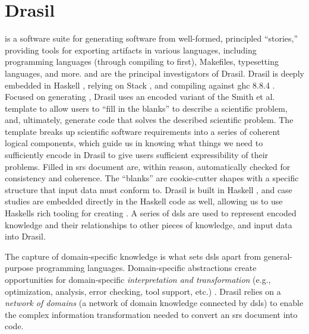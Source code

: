 \chapter{Drasil}
\label{chap:drasil}

\drasilLogoImg{}

 is a software suite
for generating software from well-formed, principled ``stories,'' providing
tools for exporting artifacts in various languages, including programming
languages (through compiling to  \cite{Carette2019} first), Makefiles,
typesetting languages, and more.  and  are the principal investigators of
Drasil. Drasil is deeply embedded in Haskell \cite{Haskell2010}, relying on
Stack \cite{HaskellStack}, and compiling against \acs{ghc} 8.8.4 \cite{GHC884}.
Focused on generating , Drasil uses an encoded variant of the Smith et
al. \cite{SmithAndLai2005}  template to allow users to ``fill in the
blanks'' to describe a scientific problem, and, ultimately, generate code that
solves the described scientific problem. The template breaks up scientific
software requirements into a series of coherent logical components, which guide
us in knowing what things we need to sufficiently encode in Drasil to give users
sufficient expressibility of their problems. Filled in \acs{srs} document are,
within reason, automatically checked for consistency and coherence. The
``blanks'' are cookie-cutter shapes with a specific structure that input data
must conform to. Drasil is built in Haskell \cite{Haskell2010}, and case studies
are embedded directly in the Haskell code as well, allowing us to use Haskells
rich tooling for creating . A series of \acsp{dsl} are used to
represent encoded knowledge and their relationships to other pieces of
knowledge, and input data into Drasil.

The capture of domain-specific knowledge is what sets \acsp{dsl} apart from
general-purpose programming languages. Domain-specific abstractions create
opportunities for domain-specific \textit{interpretation and transformation}
(e.g., optimization, analysis, error checking, tool support, etc.)
\cite{Czarnecki2005}. Drasil relies on a \textit{network of domains} (a network
of domain knowledge connected by \aclp{dsl}) to enable the complex information
transformation needed to convert an \acs{srs} document into code.

